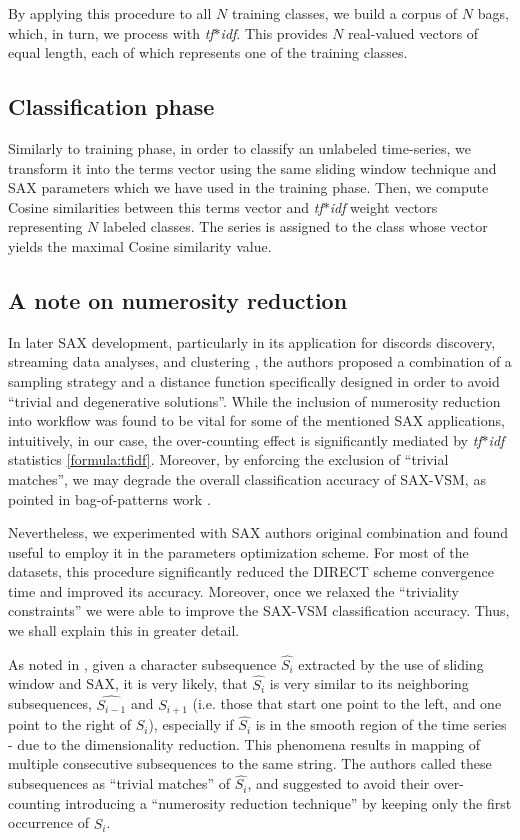 \documentclass{llncs}
\begin{document}
By applying this procedure to all $N$ training classes, we build a corpus of $N$ bags, which, in
turn, we process with \textit{tf$\ast$idf}. This provides $N$ real-valued vectors of equal
length, each of which represents one of the training classes. 

\subsection{Classification phase}
Similarly to training phase, in order to classify an unlabeled time-series, we transform it into the
terms vector using the same sliding window technique and SAX parameters which we have used 
in the training phase. Then, we compute Cosine similarities between this terms vector and 
\textit{tf$\ast$idf} weight vectors representing $N$ labeled classes. 
The series is assigned to the class whose vector yields the maximal Cosine similarity value.

\subsection{A note on numerosity reduction}
In later SAX development, particularly in its application for discords discovery,
streaming data analyses, and clustering \cite{hot_sax} \cite{streaming_sax}, the authors 
proposed a combination of a sampling strategy and a distance function specifically 
designed in order to avoid ``trivial and degenerative solutions''. While the inclusion of
numerosity reduction into workflow was found to be vital for some of the mentioned SAX applications,
intuitively, in our case, the over-counting effect is significantly mediated by \textit{tf$\ast$idf}
statistics \eqref{formula:tfidf}. Moreover, by enforcing the exclusion of ``trivial matches'', we
may degrade the overall classification accuracy of SAX-VSM, as pointed in 
bag-of-patterns work \cite{bag_patterns}.

Nevertheless, we experimented with SAX authors original combination and found useful to 
employ it in the parameters optimization scheme. 
For most of the datasets, this procedure significantly reduced the DIRECT scheme convergence 
time and improved its accuracy. Moreover, once we relaxed the ``triviality constraints'' 
we were able to improve the SAX-VSM classification
accuracy. Thus, we shall explain this in greater detail.

As noted in \cite{sax}, given a character subsequence $\hat{S_{i}}$ extracted by the use 
of sliding window and SAX, it is very likely, that $\hat{S_{i}}$ is very similar to its
neighboring subsequences, $\hat{S_{i-1}}$ and $\hat{S_{i+1}}$ (i.e. those that start one 
point to the left, and one point to the right of $\hat{S_{i}}$), especially if $\hat{S_{i}}$
is in the smooth region of the time series - due to the dimensionality reduction. 
This phenomena results in mapping of multiple consecutive subsequences
to the same string. The authors called these subsequences as ``trivial matches'' of 
$\hat{S_{i}}$, and suggested to avoid their over-counting introducing a 
``numerosity reduction technique'' by keeping only the first occurrence of $\hat{S_{i}}$. 
\end{document}
